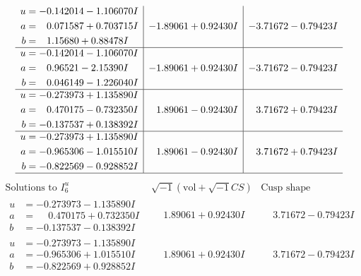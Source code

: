 \documentclass[1p]{elsarticle_modified}
\theoremstyle{definition}
\newcommand{\I}{\sqrt{-1}}
\begin{document}
$$\begin{array}{c|c|c}
\begin{aligned}
u &= -0.142014 - 1.106070 I \\
a &= \phantom{-}0.071587 + 0.703715 I \\
b &= \phantom{-}1.15680 + 0.88478 I\end{aligned}
 & -1.89061 + 0.92430 I & -3.71672 - 0.79423 I \\ \hline\begin{aligned}
u &= -0.142014 - 1.106070 I \\
a &= \phantom{-}0.96521 - 2.15390 I \\
b &= \phantom{-}0.046149 - 1.226040 I\end{aligned}
 & -1.89061 + 0.92430 I & -3.71672 - 0.79423 I \\ \hline\begin{aligned}
u &= -0.273973 + 1.135890 I \\
a &= \phantom{-}0.470175 - 0.732350 I \\
b &= -0.137537 + 0.138392 I\end{aligned}
 & \phantom{-}1.89061 - 0.92430 I & \phantom{-}3.71672 + 0.79423 I \\ \hline\begin{aligned}
u &= -0.273973 + 1.135890 I \\
a &= -0.965306 - 1.015510 I \\
b &= -0.822569 - 0.928852 I\end{aligned}
 & \phantom{-}1.89061 - 0.92430 I & \phantom{-}3.71672 + 0.79423 I\\
 \hline 
 \end{array}$$\newpage$$\begin{array}{c|c|c}  
\text{Solutions to }I^u_{6}& \I (\text{vol} + \sqrt{-1}CS) & \text{Cusp shape}\\
 \hline 
\begin{aligned}
u &= -0.273973 - 1.135890 I \\
a &= \phantom{-}0.470175 + 0.732350 I \\
b &= -0.137537 - 0.138392 I\end{aligned}
 & \phantom{-}1.89061 + 0.92430 I & \phantom{-}3.71672 - 0.79423 I \\ \hline\begin{aligned}
u &= -0.273973 - 1.135890 I \\
a &= -0.965306 + 1.015510 I \\
b &= -0.822569 + 0.928852 I\end{aligned}
 & \phantom{-}1.89061 + 0.92430 I & \phantom{-}3.71672 - 0.79423 I \\ \hline\begin{aligned}

\end{aligned}
\end{array}$$
\end{document}
